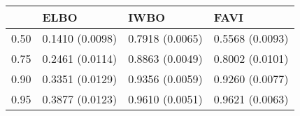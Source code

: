 \begin{tabular}{llll}
\toprule
{} &             ELBO &             IWBO &             FAVI \\
\midrule
0.50 &  0.1410 (0.0098) &  0.7918 (0.0065) &  0.5568 (0.0093) \\
0.75 &  0.2461 (0.0114) &  0.8863 (0.0049) &  0.8002 (0.0101) \\
0.90 &  0.3351 (0.0129) &  0.9356 (0.0059) &  0.9260 (0.0077) \\
0.95 &  0.3877 (0.0123) &  0.9610 (0.0051) &  0.9621 (0.0063) \\
\bottomrule
\end{tabular}
